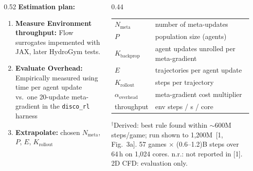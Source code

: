 \begin{frame}
	\vfill
	\begin{columns}[T]
		\begin{column}{0.52\linewidth}
			\footnotesize
			\textbf{Estimation plan:}
            \vspace{-.25cm}
			\begin{enumerate}
				\item \textbf{Measure Environment throughput:} Flow surrogates impemented with JAX, later HydroGym tests.
				\item \textbf{Evaluate Overhead:} Empirically measured using time per agent update vs.\ one 20-update meta-gradient in the \texttt{disco\_rl} harness
				\item \textbf{Extrapolate:} chosen $N_{\text{meta}}$, $P$, $E$, $K_{\text{rollout}}$
			\end{enumerate}
		\end{column}
		\begin{column}{0.44\linewidth}
			\tiny
			\begin{tabular}{@{}l@{\quad}l@{}}
				$N_{\text{meta}}$ & number of meta-updates \\
				$P$ & population size (agents) \\
				$K_{\text{backprop}}$ & agent updates unrolled per meta-gradient \\
				$E$ & trajectories per agent update \\
				$K_{\text{rollout}}$ & steps per trajectory \\
				$\alpha_{\text{overhead}}$ & meta-gradient cost multiplier \\
				throughput & env steps / s / core \\
			\end{tabular}

			\vspace{1mm}
			$^{\dagger}$Derived: best rule found within $\sim$600M steps/game; run shown to 1{,}200M~[1, Fig.~3a].
			57 games $\times$ (0.6--1.2)B steps over 64\,h on 1{,}024 cores.
			n.r.: not reported in [1]. 2D CFD: evaluation only.
		\end{column}
	\end{columns}
\end{frame}